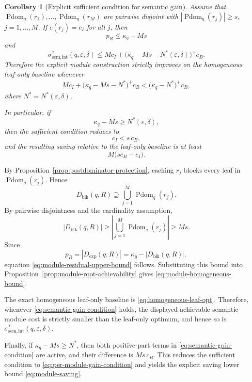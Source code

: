 \documentclass[journal]{IEEEtran}
\makeatletter
\newtheorem{corollary}{Corollary}[section]
\numberwithin{equation}{section}
\renewenvironment{proof}[1][\proofname]{\par
  \pushQED{\qed}%
  \normalfont \topsep6\p@\@plus6\p@\relax
  \trivlist
  \item[\hskip\labelsep
        \itshape
    #1\@addpunct{.}]\ignorespaces
}{%
  \popQED\endtrivlist\@endpefalse
}
\makeatother
\begin{document}
\begin{corollary}[Explicit sufficient condition for semantic gain]
\label{cor:explicit-semantic-gain}
Assume that
\(\operatorname{Pdom}_q(r_1),\ldots,\operatorname{Pdom}_q(r_M)\)
are pairwise disjoint with
\(|\operatorname{Pdom}_q(r_j)|\ge s\), \(j=1,\ldots,M\).
If \(c(r_j)=c_I\) for all \(j\), then
\begin{equation}
  p_R\le\kappa_q-Ms
\label{eq:module-residual-upper-bound}
\end{equation}
and
\begin{equation}
  \sigma_{\mathrm{sem,int}}^*
  (q,\varepsilon,\delta)
  \le
  Mc_I
  +
  \bigl(
    \kappa_q-Ms-N^*(\varepsilon,\delta)
  \bigr)^+c_B.
\label{eq:module-homogeneous-bound}
\end{equation}
Therefore the explicit module construction strictly improves on the
homogeneous leaf-only baseline whenever
\begin{align}
  Mc_I
  +
  \bigl(\kappa_q-Ms-N^*\bigr)^+c_B
  <
  \bigl(\kappa_q-N^*\bigr)^+c_B,
\label{eq:semantic-gain-condition}
\end{align}
where \(N^*=N^*(\varepsilon,\delta)\).

In particular, if
\[
  \kappa_q-Ms\ge N^*(\varepsilon,\delta),
\]
then the sufficient condition reduces to
\begin{equation}
  c_I<s\,c_B,
\label{eq:per-module-gain-condition}
\end{equation}
and the resulting saving relative to the leaf-only baseline is at least
\begin{equation}
  M\bigl(sc_B-c_I\bigr).
\label{eq:module-saving}
\end{equation}
\end{corollary}

\begin{proof}
By Proposition~\ref{prop:postdominator-protection}, caching \(r_j\) blocks
every leaf in \(\operatorname{Pdom}_q(r_j)\).  Hence
\[
  D_{\mathrm{blk}}(q,R)
  \supseteq
  \bigcup_{j=1}^{M}\operatorname{Pdom}_q(r_j).
\]
By pairwise disjointness and the cardinality assumption,
\[
  |D_{\mathrm{blk}}(q,R)|
  \ge
  \left|
    \bigcup_{j=1}^{M}\operatorname{Pdom}_q(r_j)
  \right|
  \ge Ms.
\]
Since
\[
  p_R
  =
  |D_{\mathrm{exp}}(q,R)|
  =
  \kappa_q-|D_{\mathrm{blk}}(q,R)|,
\]
equation \eqref{eq:module-residual-upper-bound} follows.  Substituting this
bound into Proposition~\ref{prop:module-root-achievability} gives
\eqref{eq:module-homogeneous-bound}.

The exact homogeneous leaf-only baseline is
\eqref{eq:homogeneous-leaf-opt}.  Therefore, whenever
\eqref{eq:semantic-gain-condition} holds, the displayed achievable
semantic-module cost is strictly smaller than the leaf-only optimum, and hence
so is \(\sigma_{\mathrm{sem,int}}^*(q,\varepsilon,\delta)\).

Finally, if \(\kappa_q-Ms\ge N^*\), then both positive-part terms in
\eqref{eq:semantic-gain-condition} are active, and their difference is
\(Ms\,c_B\).  This reduces the sufficient condition to
\eqref{eq:per-module-gain-condition} and yields the explicit saving lower bound
\eqref{eq:module-saving}.
\end{proof}
\end{document}
